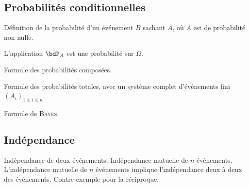 \documentclass[a4paper,french,bookmarks]{article}
\begin{document}
    \subsection*{Probabilités conditionnelles}

    \begin{enumerate}
        \ithand Définition de la probabilité d'un événement $B$ sachant $A$, où $A$ est de
        probabilité non nulle.
        
        \ithand L'application $\bdP_A$ est une probabilité sur $\Omega$.
        
        \ithand Formule des probabilités composées.
        
        \ithand Formule des probabilités totales, avec un système complet d'événements fini
        $\left(A_i\right)_{1 \leq i \leq n}$.
        
        \ithand Formule de \textsc{Bayes}.
    \end{enumerate}

    \subsection*{Indépendance}

    \begin{enumerate}
        \ithand Indépendance de deux événements. Indépendance mutuelle de $n$ événements.
        L'indépendance mutuelle de $n$ événements implique l'indépendance deux à deux des
        événements. Contre-exemple pour la réciproque.
    \end{enumerate}

    \questionsdecours
\end{document}
